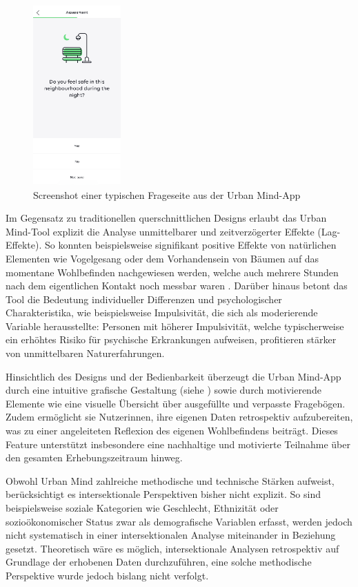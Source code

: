 \begin{figure}[h]
    \centering
    \includegraphics[width=0.3\textwidth]{Arbeit/images/urban_mind01.jpeg}
    \caption{Screenshot einer typischen Frageseite aus der Urban Mind-App}
    \label{fig:urban_mind_screenshot_1}
\end{figure}

Im Gegensatz zu traditionellen querschnittlichen Designs erlaubt das Urban Mind-Tool explizit die Analyse unmittelbarer und zeitverzögerter Effekte (Lag-Effekte). So konnten beispielsweise signifikant positive Effekte von natürlichen Elementen wie Vogelgesang oder dem Vorhandensein von Bäumen auf das momentane Wohlbefinden nachgewiesen werden, welche auch mehrere Stunden nach dem eigentlichen Kontakt noch messbar waren \parencite{bakolisUrbanMindUsing2018}. Darüber hinaus betont das Tool die Bedeutung individueller Differenzen und psychologischer Charakteristika, wie beispielsweise Impulsivität, die sich als moderierende Variable herausstellte: Personen mit höherer Impulsivität, welche typischerweise ein erhöhtes Risiko für psychische Erkrankungen aufweisen, profitieren stärker von unmittelbaren Naturerfahrungen.

Hinsichtlich des Designs und der Bedienbarkeit überzeugt die Urban Mind-App durch eine intuitive grafische Gestaltung (siehe ) sowie durch motivierende Elemente wie eine visuelle Übersicht über ausgefüllte und verpasste Fragebögen. Zudem ermöglicht sie Nutzer\genderstern innen, ihre eigenen Daten retrospektiv aufzubereiten, was zu einer angeleiteten Reflexion des eigenen Wohlbefindens beiträgt. Dieses Feature unterstützt insbesondere eine nachhaltige und motivierte Teilnahme über den gesamten Erhebungszeitraum hinweg.

Obwohl Urban Mind zahlreiche methodische und technische Stärken aufweist, berücksichtigt es intersektionale Perspektiven bisher nicht explizit. So sind beispielsweise soziale Kategorien wie Geschlecht, Ethnizität oder sozioökonomischer Status zwar als demografische Variablen erfasst, werden jedoch nicht systematisch in einer intersektionalen Analyse miteinander in Beziehung gesetzt. Theoretisch wäre es möglich, intersektionale Analysen retrospektiv auf Grundlage der erhobenen Daten durchzuführen, eine solche methodische Perspektive wurde jedoch bislang nicht verfolgt.

